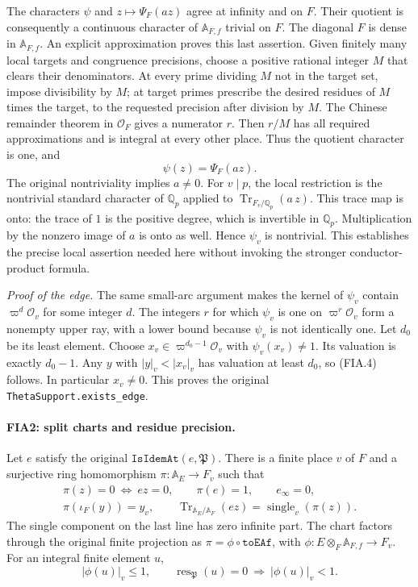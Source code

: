 The characters \(\psi\) and \(z\mapsto\Psi_F(az)\) agree at
infinity and on \(F\).  Their quotient is consequently a
continuous character of \(\mathbb A_{F,f}\) trivial on \(F\).
The diagonal \(F\) is dense in \(\mathbb A_{F,f}\).  An explicit
approximation proves this last assertion.  Given finitely many
local targets and congruence precisions, choose a positive rational
integer \(M\) that clears their denominators.  At every prime
dividing \(M\) not in the target set, impose divisibility by \(M\);
at target primes prescribe the desired residues of \(M\) times
the target, to the requested precision after division by \(M\).
The Chinese remainder theorem in \(\mathcal O_F\) gives a
numerator \(r\).  Then \(r/M\) has all required approximations
and is integral at every other place.  Thus the quotient character
is one, and
\[
                    \psi(z)=\Psi_F(az).
 \tag{FIA.7}
\]
The original nontriviality implies \(a\ne0\).
For \(v\mid p\), the local restriction is the nontrivial standard
character of \(\mathbb Q_p\) applied to
\(\operatorname{Tr}_{F_v/\mathbb Q_p}(a\,z)\).
This trace map is onto: the trace of \(1\) is the positive degree,
which is invertible in \(\mathbb Q_p\).  Multiplication by
the nonzero image of \(a\) is onto as well.  Hence \(\psi_v\)
is nontrivial.  This establishes the precise local assertion
needed here without invoking the stronger conductor-product
formula.

\emph{Proof of the edge.}
The same small-arc argument makes the kernel of \(\psi_v\)
contain \(\varpi^d\mathcal O_v\) for some integer \(d\).
The integers \(r\) for which \(\psi_v\) is one on
\(\varpi^r\mathcal O_v\) form a nonempty upper ray, with a lower
bound because \(\psi_v\) is not identically one.  Let \(d_0\)
be its least element.  Choose
\(x_v\in\varpi^{d_0-1}\mathcal O_v\) with
\(\psi_v(x_v)\ne1\).  Its valuation is exactly \(d_0-1\).
Any \(y\) with \(|y|_v<|x_v|_v\) has valuation at least \(d_0\),
so (FIA.4) follows.  In particular \(x_v\ne0\).
This proves the original \texttt{ThetaSupport.exists\_edge}.

\paragraph{FIA2: split charts and residue precision.}
\label{claim:FIA2}
Let \(e\) satisfy the original
\(\texttt{IsIdemAt}(e,\mathfrak P)\).  There is a finite place
\(v\) of \(F\) and a surjective ring homomorphism
\(\pi:\mathbb A_E\to F_v\) such that
\[
 \begin{gathered}
 \pi(z)=0\ \Longleftrightarrow\ ez=0,\qquad
 \pi(e)=1,\qquad e_\infty=0,\\
 \pi(\iota_F(y))=y_v,\qquad
 \operatorname{Tr}_{\mathbb A_E/\mathbb A_F}(ez)
       =\operatorname{single}_v(\pi(z)).
 \end{gathered}                                                   \tag{FIA.8}
\]
The single component on the last line has zero infinite part.
The chart factors through the original finite projection as
\(\pi=\phi\circ\texttt{toEAf}\), with
\(\phi:E\otimes_F\mathbb A_{F,f}\to F_v\).
For an integral finite element \(u\),
\[
 |\phi(u)|_v\le1,\qquad
 \operatorname{res}_{\mathfrak P}(u)=0
       \ \Longrightarrow\ |\phi(u)|_v<1.
 \tag{FIA.9}
\]

